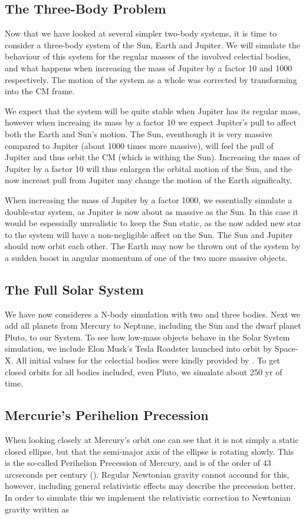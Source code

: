 \documentclass[twocolumn]{aastex62}
\begin{document}
\subsection{The Three-Body Problem} \label{subsec:three_body_prob}
Now that we have looked at several simpler two-body systems, it is time to
consider a three-body system of the Sun, Earth and Jupiter. We will simulate the
behaviour of this system for the regular masses of the involved celectial
bodies, and what happens when increasing the mass of Jupiter by a factor 10 and
1000 respectively. The motion of the system as a whole was corrected by
transforming into the CM frame.

We expect that the system will be quite stable when Jupiter has its regular
mass, however when increaing its mass by a factor 10 we expect Jupiter's pull to
affect both the Earth and Sun's motion. The Sun, eventhough it is very massive
compared to Jupiter (about 1000 times more massive), will feel the pull of
Jupiter and thus orbit the CM (which is withing the Sun). Increasing the mass of
Jupiter by a factor 10 will thus enlargen the orbital motion of the Sun, and the
now increast pull from Jupiter may change the motion of the Earth significalty. 

When increasing the mass of Jupiter by a factor 1000, we essentially simulate a
double-star system, as Jupiter is now about as massive as the Sun. In this case
it would be espessially unrealistic to keep the Sun static, as the now added new
star to the system will have a non-negligible affect on the Sun. The Sun and
Jupiter should now orbit each other. The Earth may now be thrown out of the
system by a sudden boost in angular momentum of one of the two more massive
objects. 


\subsection{The Full Solar System} \label{subsec:solar_system}
We have now consideres a N-body simulation with two and three bodies. Next we
add all planets from Mercury to Neptune, including the Sun and the dwarf planet
Pluto, to our System. To see how low-mass objects behave in the Solar System
simulation, we include Elon Musk's Tesla Roadster launched into orbit by
Space-X. All initial values for the celectial bodies were kindly provided by
\cite{nasa:2018}.
To get closed orbits for all bodies included, even Pluto, we simulate
about 250 yr of time.

\subsection{Mercurie's Perihelion Precession}\label{sec:mercuryprecession}
When looking closely at Mercury's orbit one can see that it is not simply a
static closed ellipse, but that the semi-major axis of the ellipse is rotating
slowly. This is the so-called Perihelion Precession of Mercury, and is of the
order of 43 arcseconds per century (\cite{jensen:2019}). Regular Newtonian gravity cannot accound for
this, however, including general relativistic effects may describe the
precession better. In order to simulate this we implement the
relativistic correction to Newtonian gravity written as 
\end{document}

